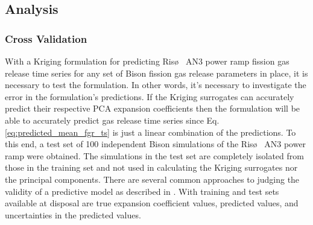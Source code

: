 \subsection{Analysis}
\label{subsec:test_on_point_kinetics}


\subsubsection{Cross Validation}
\label{subsec:cross_validation}

With a Kriging formulation for predicting Ris\o~ AN3 power ramp fission gas release time series for any set of Bison fission gas release parameters in place, it is necessary to test the formulation. In other words, it's necessary to investigate the error in the formulation's predictions. If the Kriging surrogates can accurately predict their respective \ac{PCA} expansion coefficients then the formulation will be able to accurately predict gas release time series since Eq. \ref{eq:predicted_mean_fgr_ts} is just a linear combination of the predictions. To this end, a test set of 100 independent Bison simulations of the Ris\o~ AN3 power ramp were obtained. The simulations in the test set are completely isolated from those in the training set and not used in calculating the Kriging surrogates nor the principal components. There are several common approaches to judging the validity of a predictive model as described in \cite{Jones_Schonlau}. With training and test sets available at disposal are true expansion coefficient values, predicted values, and uncertainties in the predicted values. 

